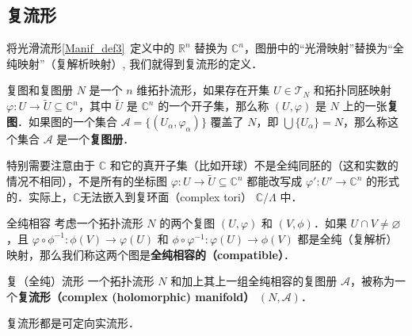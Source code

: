 

\subsection{复流形}

将光滑流形\autoref{Manif_def3}~定义中的 $\mathbb{R}^n$ 替换为 $\mathbb{C}^n$，图册中的“光滑映射”替换为“全纯映射”（复解析映射）, 我们就得到复流形的定义．


\begin{definition}{复图和复图册}
$N$ 是一个 $n$ 维拓扑流形，如果存在开集 $U \in \mathcal{T}_N$ 和拓扑同胚映射 $\varphi: U \rightarrow \tilde{U} \subseteq \mathbb{C}^n$，其中 $\tilde{U}$ 是 $\mathbb{C}^n$ 的一个开子集，那么称 $(U,\varphi)$ 是 $N$ 上的一张\textbf{复图}．如果图的一个集合 $\mathcal{A}=\{(U_\alpha, \varphi_\alpha)\}$ 覆盖了 $N$，即 $\bigcup\{U_\alpha\}=N$，那么称这个集合 $\mathcal{A}$ 是一个\textbf{复图册}．
\end{definition}

特别需要注意由于 $\mathbb{C}$ 和它的真开子集（比如开球）不是全纯同胚的（这和实数的情况不相同），不是所有的坐标图 $\varphi: U \rightarrow \tilde{U} \subseteq \mathbb{C}^n$ 都能改写成 $\varphi': U' \rightarrow \mathbb{C}^n$ 的形式的．实际上，$\mathbb{C}$无法嵌入到复环面（complex tori） $\mathbb{C} / \Lambda$ 中．

\begin{definition}{全纯相容}
考虑一个拓扑流形 $N$ 的两个复图 $(U, \varphi)$ 和 $(V, \phi)$．如果 $U \cap V \neq \varnothing$，且 $\varphi \circ \phi^{-1}: \phi(V) \rightarrow \varphi(U)$ 和 $\phi \circ \varphi^{-1}: \varphi(U) \rightarrow \phi(V)$ 都是全纯（复解析）映射，那么我们称这两个图是\textbf{全纯相容的（compatible）}．
\end{definition}

\begin{definition}{复（全纯）流形}\label{CMani_def1}
一个拓扑流形 $N$ 和加上其上一组全纯相容的复图册 $\mathcal{A}$，被称为一个\textbf{复流形（complex (holomorphic) manifold）} $(N, \mathcal{A})$．
\end{definition}

\begin{theorem}{}
复流形都是可定向实流形．
\end{theorem}



